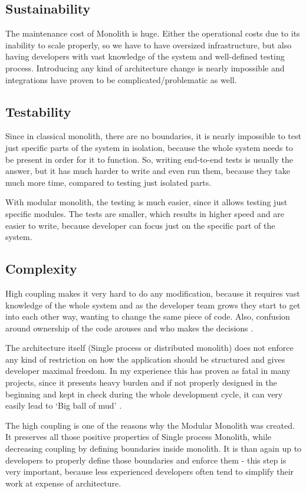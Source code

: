 \subsection{Sustainability}
The maintenance cost of Monolith is huge. Either the operational costs due to its inability to scale properly, so we have to have oversized infrastructure, but also having developers with vast knowledge of the system and well-defined testing process. Introducing any kind of architecture change is nearly impossible and integrations have proven to be complicated/problematic as well.

\subsection{Testability}
Since in classical monolith, there are no boundaries, it is nearly impossible to test just specific parts of the system in isolation, because the whole system needs to be present in order for it to function. So, writing end-to-end tests is usually the answer, but it has much harder to write and even run them, because they take much more time, compared to testing just isolated parts.

With modular monolith, the testing is much easier, since it allows testing just specific modules. The tests are smaller, which results in higher speed and are easier to write, because developer can focus just on the specific part of the system.

\subsection{Complexity}
High coupling makes it very hard to do any modification, because it requires vast knowledge of the whole system and as the developer team grows they start to get into each other way, wanting to change the same piece of code. Also, confusion around ownership of the code arouses and who makes the decisions \cite{MON_TO_MS_MONOLITH}.

The architecture itself (Single process or distributed monolith) does not enforce any kind of restriction on how the application should be structured and gives developer maximal freedom. In my experience this has proven as fatal in many projects, since it presents heavy burden and if not properly designed in the beginning and kept in check during the whole development cycle, it can very easily lead to `Big ball of mud' \cite{BIG_BALL_OF_MUD}.

The high coupling is one of the reasons why the Modular Monolith was created. It preserves all those positive properties of Single process Monolith, while decreasing coupling by defining boundaries inside monolith. It is than again up to developers to properly define those boundaries and enforce them - this step is very important, because less experienced developers often tend to simplify their work at expense of architecture.

